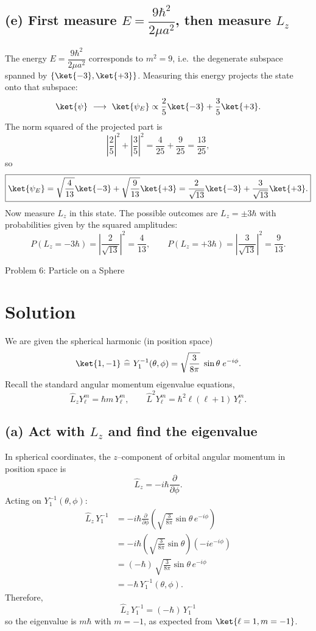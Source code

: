 \documentclass{article}
\begin{document}
\subsection*{(e) First measure $E=\dfrac{9\hbar^2}{2\mu a^2}$, then measure $L_z$}

The energy $E=\dfrac{9\hbar^2}{2\mu a^2}$ corresponds to $m^2=9$, i.e.\ the degenerate
subspace spanned by $\{\ket{-3},\ket{+3}\}$. Measuring this energy projects the state onto
that subspace:
\[
\ket{\psi}\ \longrightarrow\
\ket{\psi_E}
\propto
\frac{2}{5}\ket{-3}+\frac{3}{5}\ket{+3}.
\]
The norm squared of the projected part is
\[
\left|\frac{2}{5}\right|^2+\left|\frac{3}{5}\right|^2=\frac{4}{25}+\frac{9}{25}=\frac{13}{25},
\]
so
\[
\boxed{
\ket{\psi_E}
=
\sqrt{\frac{4}{13}}\ket{-3}
+
\sqrt{\frac{9}{13}}\ket{+3}
=
\frac{2}{\sqrt{13}}\ket{-3}+\frac{3}{\sqrt{13}}\ket{+3}.
}
\]
Now measure $L_z$ in this state. The possible outcomes are $L_z=\pm 3\hbar$ with
probabilities given by the squared amplitudes:
\[
\boxed{
P(L_z=-3\hbar)=\left|\frac{2}{\sqrt{13}}\right|^2=\frac{4}{13},
\qquad
P(L_z=+3\hbar)=\left|\frac{3}{\sqrt{13}}\right|^2=\frac{9}{13}.
}
\]

\newpage

{\huge Problem 6: Particle on a Sphere}

\section*{Solution}

We are given the spherical harmonic (in position space)
\[
\ket{1,-1}\ \widehat{=}\ Y_1^{-1}(\theta,\phi)
=
\sqrt{\frac{3}{8\pi}}\;\sin\theta\;e^{-i\phi}.
\]
Recall the standard angular momentum eigenvalue equations,
\[
\hat L_z Y_\ell^{m} = \hbar m\,Y_\ell^{m},
\qquad
\hat L^2 Y_\ell^{m} = \hbar^2\ell(\ell+1)\,Y_\ell^{m}.
\]

\subsection*{(a) Act with $L_z$ and find the eigenvalue}

In spherical coordinates, the $z$--component of orbital angular momentum in position space is
\[
\hat L_z=-i\hbar\frac{\partial}{\partial\phi}.
\]
Acting on $Y_1^{-1}(\theta,\phi)$:
\begin{align*}
\hat L_z\,Y_1^{-1}
&=
-i\hbar\frac{\partial}{\partial\phi}
\left(
\sqrt{\frac{3}{8\pi}}\sin\theta\,e^{-i\phi}
\right)\\[4pt]
&=
-i\hbar\left(
\sqrt{\frac{3}{8\pi}}\sin\theta
\right)\left(-i e^{-i\phi}\right)\\[4pt]
&=
(-\hbar)\,
\sqrt{\frac{3}{8\pi}}\sin\theta\,e^{-i\phi}\\[4pt]
&=
-\hbar\,Y_1^{-1}(\theta,\phi).
\end{align*}
Therefore,
\[
\boxed{\ \hat L_z\,Y_1^{-1} = (-\hbar)\,Y_1^{-1}\ }
\]
so the eigenvalue is $m\hbar$ with $m=-1$, as expected from $\ket{\ell=1,m=-1}$.
\end{document}
